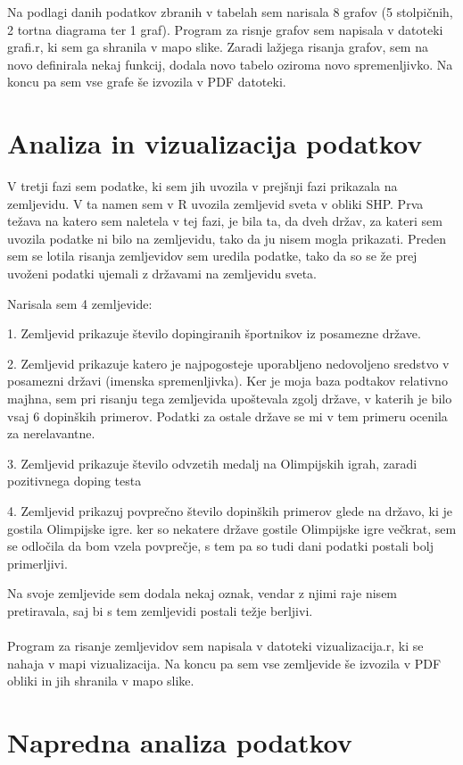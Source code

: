 \documentclass[11pt,a4paper]{article}
\begin{document}
Na podlagi danih podatkov zbranih v tabelah sem narisala 8 grafov (5 stolpičnih, 2 tortna diagrama ter 1 graf).
Program za risnje grafov sem napisala v datoteki grafi.r, ki sem ga shranila v mapo slike. Zaradi lažjega risanja grafov, sem na novo definirala nekaj funkcij, dodala novo tabelo oziroma novo spremenljivko.
Na koncu pa sem vse grafe še izvozila v PDF datoteki.



\newpage

\section{Analiza in vizualizacija podatkov}

V tretji fazi sem podatke, ki sem jih uvozila v prejšnji fazi prikazala na zemljevidu.
V ta namen sem v R uvozila zemljevid sveta v obliki SHP.
Prva težava na katero sem naletela v tej fazi, je bila ta, da dveh držav, za kateri sem uvozila podatke ni bilo na zemljevidu, tako da ju nisem mogla prikazati. 
Preden sem se lotila risanja zemljevidov sem uredila podatke, tako da so se že prej uvoženi podatki ujemali z državami na zemljevidu sveta.

Narisala sem 4 zemljevide:

1. Zemljevid prikazuje število dopingiranih športnikov iz posamezne države.

2. Zemljevid prikazuje katero je najpogosteje uporabljeno nedovoljeno sredstvo v posamezni državi (imenska spremenljivka).
Ker je moja baza podtakov relativno majhna, sem pri risanju tega zemljevida upoštevala zgolj države, v katerih je bilo vsaj 6 dopinških primerov. Podatki za ostale države se mi v tem primeru ocenila za nerelavantne.

3. Zemljevid prikazuje število odvzetih medalj na Olimpijskih igrah, zaradi pozitivnega doping testa

4. Zemljevid prikazuj povprečno število dopinških primerov glede na državo, ki je gostila Olimpijske igre. 
ker so nekatere države gostile Olimpijske igre večkrat, sem se odločila da bom vzela povprečje, s tem pa so tudi dani podatki postali bolj primerljivi.

Na svoje zemljevide sem dodala nekaj oznak, vendar z njimi raje nisem pretiravala, saj bi s tem zemljevidi postali težje berljivi.\\
\\
Program za risanje zemljevidov sem napisala v datoteki vizualizacija.r, ki se nahaja v mapi vizualizacija. 
Na koncu pa sem vse zemljevide še izvozila v PDF obliki in jih shranila v mapo slike.



\section{Napredna analiza podatkov}

\end{document}
